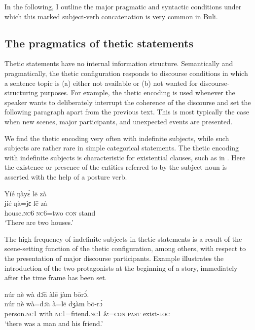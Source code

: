 \documentclass[output=paper]{langsci/langscibook}
\begin{document}
In the following, I outline the major pragmatic and syntactic conditions under which this marked subject-verb concatenation is very common in Buli.

\subsection{The pragmatics of thetic statements}\label{sec:schwarz:3.4}

Thetic statements have no internal information structure. Semantically and pragmatically, the thetic configuration responds to discourse conditions in which a sentence topic is (a) either not available or (b) not wanted for discourse-structuring purposes. For example, the thetic encoding is used whenever the speaker wants to deliberately interrupt the coherence of the discourse and set the following paragraph apart from the previous text. This is most typically the case when new scenes, major participants, and unexpected events are presented. 

We find the thetic encoding very often with indefinite subjects, while such subjects are rather rare in simple categorical statements. The thetic encoding with indefinite subjects is characteristic for existential clauses, such as in . Here the existence or presence of the entities referred to by the subject noun is asserted with the help of a posture verb.

\ea\label{ex:schwarz:20}
\glll   Yíé    ŋày\`{ɛ}    l\={e}  zà\\
    \textup{jíé}    ŋà=jɛ    l\={e}  {zà} \\
       house.\textsc{nc}6  \textsc{nc}6=two  \textsc{con}  stand\\
\glt ‘There are two houses.’
\z

The high frequency of indefinite subjects in thetic statements is a result of the scene-setting function of the thetic configuration, among others, with respect to the presentation of major discourse participants. Example  illustrates the introduction of the two protagonists at the beginning of a story, immediately after the time frame has been set. 

\ea\label{ex:schwarz:21}
\glll   núr    nè  {wà   d\={ɔ}\={a}}    àl\={e}    jàm  b\={o}r{ɔ́}.\\
    \textup{núr}   nè wà=\textup{d\={ɔ}a}      à=l\={e}    dʒàm  b\={o}-rɔ́\\
       person.\textsc{nc}1  with  \textsc{nc}1=friend.\textsc{nc}1  \&=\textsc{con}  \textsc{past}  exist-\textsc{loc}\\
\glt ‘there was a man and his friend.’
\z
\end{document}
